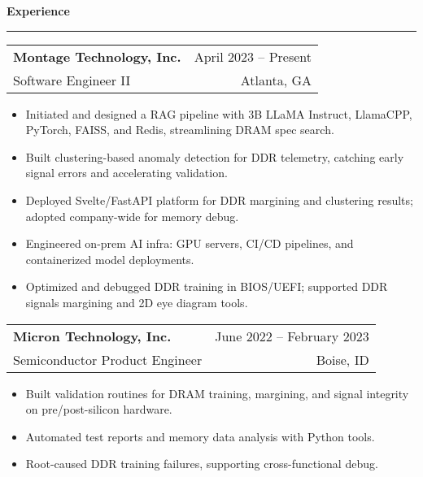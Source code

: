 \documentclass[a4paper,10pt]{article}
\begin{document}
\vspace{0.1in}
\textbf{Experience}
\vspace{0.05in}
\hrule
\vspace{0.1in}

\noindent
\begin{minipage}[t]{0.99\textwidth}
  \begin{tabularx}{\textwidth}{@{} X r @{}}
  \textbf{Montage Technology, Inc.} & April 2023 -- Present \\
  Software Engineer II & Atlanta, GA \\
  \end{tabularx}
\end{minipage}


\vspace{4pt}
\begin{itemize}[leftmargin=*, itemsep=0pt, topsep=0pt, parsep=0pt, partopsep=0pt]
  \item Initiated and designed a RAG pipeline with 3B LLaMA Instruct, LlamaCPP, PyTorch, FAISS, and Redis, streamlining DRAM spec search.
  \item Built clustering-based anomaly detection for DDR telemetry, catching early signal errors and accelerating validation.
  \item Deployed Svelte/FastAPI platform for DDR margining and clustering results; adopted company-wide for memory debug.
  \item Engineered on-prem AI infra: GPU servers, CI/CD pipelines, and containerized model deployments.
  \item Optimized and debugged DDR training in BIOS/UEFI; supported DDR signals margining and 2D eye diagram tools.
\end{itemize}

\vspace{0.1in}

\noindent
\begin{minipage}[t]{0.99\textwidth}
  \begin{tabularx}{\textwidth}{@{} X r @{}}
  \textbf{Micron Technology, Inc.} & June 2022 -- February 2023 \\
Semiconductor Product Engineer & Boise, ID \\
  \end{tabularx}
\end{minipage}
\vspace{4pt}
\begin{itemize}[leftmargin=*, itemsep=0pt, topsep=0pt, parsep=0pt, partopsep=0pt]
  \item Built validation routines for DRAM training, margining, and signal integrity on pre/post-silicon hardware.
  \item Automated test reports and memory data analysis with Python tools.
  \item Root-caused DDR training failures, supporting cross-functional debug.
\end{itemize}
\end{document}
